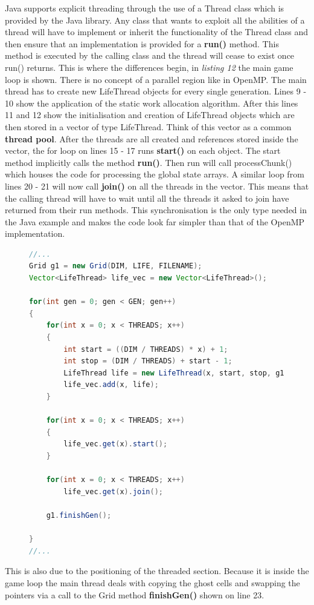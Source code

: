 \documentclass[11pt]{article} %
\begin{document}
Java supports explicit threading through the use of a Thread class which is provided by the Java library. Any class that wants to exploit all the abilities of a thread will have to implement or inherit the functionality of the Thread class and then ensure that an implementation is provided for a {\bf run()}  method. This method is executed by the calling class and the thread will cease to exist once run() returns. This is where the differences begin, in {\it listing 12} the main game loop is shown. There is no concept of a parallel region like in OpenMP. The main thread has to create new LifeThread objects for every single generation. Lines 9 - 10 show the application of the static work allocation algorithm. After this lines 11 and 12 show the initialisation and creation of LifeThread objects which are then stored in a vector of type LifeThread. Think of this vector as a common {\bf thread pool}. After the threads are all created and references stored inside the vector, the for loop on lines 15 - 17 runs {\bf start()} on each object. The start method implicitly calls the method {\bf run()}. Then run will call processChunk() which houses the code for processing the global state arrays. A similar loop from lines 20 - 21 will now call {\bf join()} on all the threads in the vector. This means that the calling thread will have to wait until all the threads it asked to join have returned from their run methods. This synchronisation is the only type needed in the Java example and makes the code look far simpler than that of the OpenMP implementation. 
\begin{figure}
\begin{lstlisting}[language=Java, caption={Class GoL main game loop in GoL.java}]
//...
Grid g1 = new Grid(DIM, LIFE, FILENAME);
Vector<LifeThread> life_vec = new Vector<LifeThread>();

for(int gen = 0; gen < GEN; gen++)
{
    for(int x = 0; x < THREADS; x++)
    {
        int start = ((DIM / THREADS) * x) + 1;
        int stop = (DIM / THREADS) + start - 1;
        LifeThread life = new LifeThread(x, start, stop, g1, DIM);
        life_vec.add(x, life);
    }

    for(int x = 0; x < THREADS; x++)
    {
        life_vec.get(x).start();
    }   

    for(int x = 0; x < THREADS; x++)
        life_vec.get(x).join();
    
    g1.finishGen();
  
}
//...
\end{lstlisting}
\end{figure}
This is also due to the positioning of the threaded section. Because it is inside the game loop the main thread deals with copying the ghost cells and swapping the pointers via a call to the Grid method {\bf finishGen()} shown on line 23.
\end{document}
